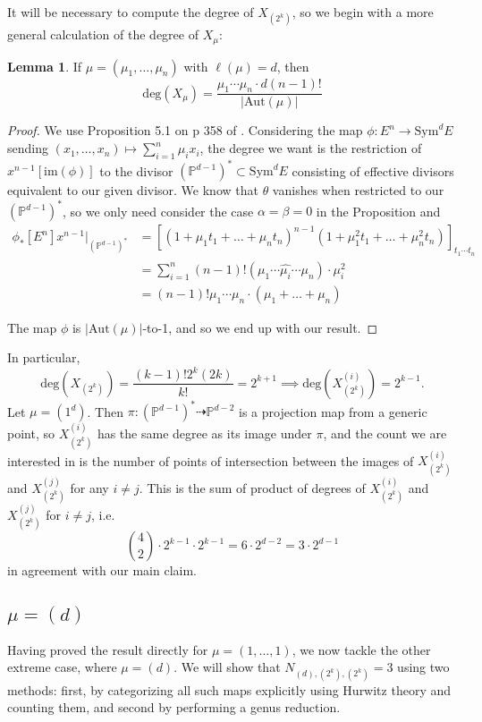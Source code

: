 \documentclass[11pt]{article}           %
\newcommand{\Aut}{\text{Aut}}
\renewcommand{\P}{\mathbb P}
\theoremstyle{definition}
\newtheorem{lem}[thm]{Lemma}
\begin{document}
It will be necessary to compute the degree of $X_{(2^k)}$, so we begin with a more general calculation of the degree of $X_{\mu}$:

\begin{lem}
  \label{lemma:degree}
  If $\mu=(\mu_1,\dots,\mu_n)$ with $\ell(\mu)=d$, then
  \[
  \text{deg}(X_{\mu})=\frac{\mu_1\cdots\mu_n\cdot d(n-1)!}{|\text{Aut}(\mu)|}
  \]
\end{lem}

\begin{proof}
  We use Proposition 5.1 on p 358 of \cite{Harris}. Considering the map
  $\phi:E^n\to\text{Sym}^dE$ sending $(x_1,\dots,x_n)\mapsto \sum_{i=1}^n\mu_ix_i$,
  the degree we want is the restriction of $x^{n-1}[\text{im}(\phi)]$ to
  the divisor $(\P^{d-1})^*\subset\text{Sym}^dE$ consisting of effective divisors
  equivalent to our given divisor. We know that $\theta$ vanishes when
  restricted to our $(\P^{d-1})^*$, so we only need consider the case $\alpha=\beta=0$ in the Proposition and
  \begin{align*}
    \phi_*[E^n]x^{n-1}\bigg|_{(\P^{d-1})^*}&=[(1+\mu_1t_1+\dots+\mu_nt_n)^{n-1}(1+\mu_1^2t_1+\dots+\mu_n^2t_n)]_{t_1\cdots t_n}\\
    &=\sum_{i=1}^n(n-1)!(\mu_1\cdots\hat{\mu_i}\cdots \mu_n)\cdot\mu_i^2\\
    &=(n-1)!\mu_1\cdots\mu_n\cdot (\mu_1+\dots+\mu_n)
  \end{align*}

  
  The map $\phi$ is $|\Aut(\mu)|$-to-1, and so we end up with our result.
  \end{proof}
In particular,
\[
\text{deg}(X_{(2^k)})=\frac{(k-1)!2^k(2k)}{k!}=2^{k+1}\implies \text{deg}(X_{(2^k)}^{(i)})=2^{k-1}.
\]
Let $\mu=(1^{d})$. Then $\pi:(\P^{d-1})^*\dashrightarrow\P^{d-2}$ is
a projection map from a generic point, so $X_{(2^k)}^{(i)}$ has the same
degree as its image under $\pi$, and the count we are interested in is the
number of points of intersection between the images of $X_{(2^k)}^{(i)}$ and
$X_{(2^k)}^{(j)}$ for any $i\neq j$.
This is the sum of product of degrees of $X_{(2^k)}^{(i)}$ and $X_{(2^k)}^{(j)}$ for $i\neq j$, i.e.
\[
\binom 42\cdot 2^{k-1}\cdot 2^{k-1}=6\cdot 2^{d-2}=3\cdot 2^{d-1}
\]
in agreement with our main claim.


\subsection{$\mu=(d)$}

Having proved the result directly for $\mu=(1,\dots,1)$, we now tackle the other extreme case, where $\mu=(d)$. We will show that $N_{(d),(2^k),(2^k)}=3$
using two methods: first, by categorizing all such maps explicitly using Hurwitz theory and counting them, and second by performing a genus reduction.
\end{document}
